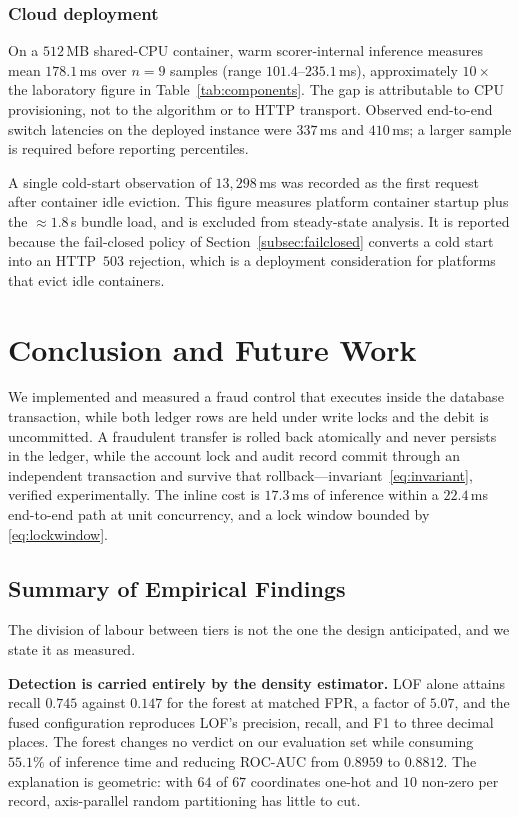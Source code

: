 \documentclass[conference]{IEEEtran}
\begin{document}
\subsubsection{Cloud deployment}
On a $512$\,MB shared-CPU container, warm scorer-internal inference
measures mean $178.1$\,ms over $n=9$ samples (range
$101.4$--$235.1$\,ms), approximately $10\times$ the laboratory figure
in Table~\ref{tab:components}. The gap is attributable to CPU
provisioning, not to the algorithm or to HTTP transport. Observed
end-to-end switch latencies on the deployed instance were $337$\,ms and
$410$\,ms; a larger sample is required before reporting percentiles.

A single cold-start observation of $13{,}298$\,ms was recorded as the
first request after container idle eviction. This figure measures
platform container startup plus the $\approx 1.8$\,s bundle load, and
is excluded from steady-state analysis. It is reported because the
fail-closed policy of Section~\ref{subsec:failclosed} converts a cold
start into an HTTP~$503$ rejection, which is a deployment
consideration for platforms that evict idle containers.

\section{Conclusion and Future Work}
\label{sec:conclusion}

We implemented and measured a fraud control that executes inside the
database transaction, while both ledger rows are held under write
locks and the debit is uncommitted. A fraudulent transfer is rolled
back atomically and never persists in the ledger, while the account
lock and audit record commit through an independent transaction and
survive that rollback---invariant~\eqref{eq:invariant}, verified
experimentally. The inline cost is $17.3$\,ms of inference within a
$22.4$\,ms end-to-end path at unit concurrency, and a lock window
bounded by \eqref{eq:lockwindow}.

\subsection{Summary of Empirical Findings}

The division of labour between tiers is not the one the design
anticipated, and we state it as measured.

\textbf{Detection is carried entirely by the density estimator.} LOF
alone attains recall $0.745$ against $0.147$ for the forest at matched
FPR, a factor of $5.07$, and the fused configuration reproduces LOF's
precision, recall, and F1 to three decimal places. The forest changes
no verdict on our evaluation set while consuming $55.1\%$ of inference
time and reducing ROC-AUC from $0.8959$ to $0.8812$. The explanation is
geometric: with $64$ of $67$ coordinates one-hot and $10$ non-zero per
record, axis-parallel random partitioning has little to cut.
\end{document}
